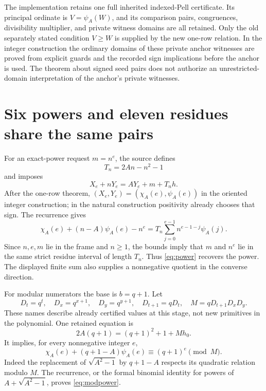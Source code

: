 \documentclass[11pt]{article}
\theoremstyle{remark}\newtheorem{remark}[theorem]{Remark}
\begin{document}
The implementation retains one full inherited indexed-Pell certificate. Its principal ordinate is $V=\psi_A(W)$, and its comparison pairs, congruences, divisibility multiplier, and private witness domains are all retained. Only the old separately stated condition $V\ge W$ is supplied by the new one-row relation. In the integer construction the ordinary domains of these private anchor witnesses are proved from explicit guards and the recorded sign implications before the anchor is used. The theorem about signed seed pairs does not authorize an unrestricted-domain interpretation of the anchor's private witnesses.

\section{Six powers and eleven residues share the same pairs}
\label{sec:residues}

For an exact-power request $m=n^e$, the source defines
\begin{equation}\label{eq:Tn}
 T_n=2An-n^2-1
\end{equation}
and imposes
\begin{equation}\label{eq:power}
 X_e+nY_e=AY_e+m+T_n h.
\end{equation}
After the one-row theorem, $(X_e,Y_e)=(\chi_A(e),\psi_A(e))$ in the oriented integer construction; in the natural construction positivity already chooses that sign. The recurrence gives
\begin{equation}\label{eq:recpower}
 \chi_A(e)+(n-A)\psi_A(e)-n^e
  =T_n\sum_{j=0}^{e-1}n^{e-1-j}\psi_A(j).
\end{equation}
Since $n,e,m$ lie in the frame and $n\ge1$, the bounds imply that $m$ and $n^e$ lie in the same strict residue interval of length $T_n$. Thus \eqref{eq:power} recovers the power. The displayed finite sum also supplies a nonnegative quotient in the converse direction.

For modular numerators the base is $b=q+1$. Let
\[
 D_t=q^t,\quad D_x=q^{x+1},\quad D_y=q^{y+1},
 \quad D_{t+1}=qD_t,
 \quad M=qD_{t+1}D_xD_y.
\]
These names describe already certified values at this stage, not new primitives in the polynomial. One retained equation is
\begin{equation}\label{eq:commonroot}
 2A(q+1)=(q+1)^2+1+Mh_0.
\end{equation}
It implies, for every nonnegative integer $e$,
\begin{equation}\label{eq:modpower}
 \chi_A(e)+(q+1-A)\psi_A(e)\equiv(q+1)^e\pmod M.
\end{equation}
Indeed the replacement of $\sqrt{A^2-1}$ by $q+1-A$ respects its quadratic relation modulo $M$. The recurrence, or the formal binomial identity for powers of $A+\sqrt{A^2-1}$, proves \eqref{eq:modpower}.
\end{document}
